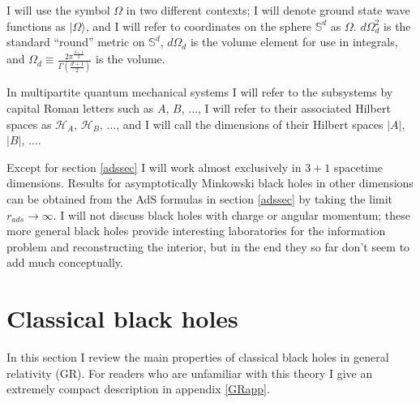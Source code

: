 \documentclass[12pt]{article}
\newcommand{\HA}{\mathcal{H}_A}
\newcommand{\HB}{\mathcal{H}_B}
\newcommand{\ran}{\rangle}
\begin{document}
I will use the symbol $\Omega$ in two different contexts; I will denote ground state wave functions as $|\Omega\ran$, and I will refer to coordinates on the sphere $\mathbb{S}^d$ as $\Omega$.  $d\Omega_d^2$ is the standard ``round'' metric on $\mathbb{S}^d$, $d\Omega_d$ is the volume element for use in integrals, and $\Omega_d\equiv \frac{2\pi^{\frac{d+1}{2}}}{\Gamma\left(\frac{d+1}{2}\right)}$ is the volume.

In multipartite quantum mechanical systems I will refer to the subsystems by capital Roman letters such as $A$, $B$, $\ldots$, I will refer to their associated Hilbert spaces as $\HA$, $\HB$, $\ldots$, and I will call the dimensions of their Hilbert spaces $|A|$, $|B|$, $\ldots$.  

Except for section \ref{adssec} I will work almost exclusively in $3+1$ spacetime dimensions.  Results for asymptotically Minkowski black holes in other dimensions can be obtained from the AdS formulas in section \ref{adssec} by taking the limit $r_{ads}\to\infty$.  I will not discuss black holes with charge or angular momentum; these more general black holes provide interesting laboratories for the information problem and reconstructing the interior, but in the end they so far don't seem to add much conceptually. 

\section{Classical black holes}\label{clbhsec}

In this section I review the main properties of classical black holes in general relativity (GR).  For readers who are unfamiliar with this theory I give an extremely compact description in appendix \ref{GRapp}.
\end{document}
